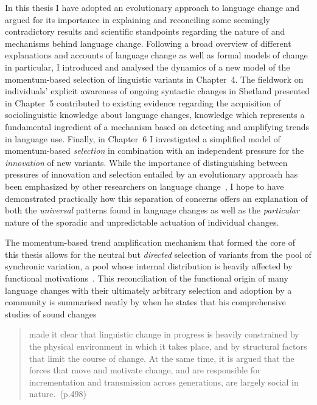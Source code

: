 In this thesis I have adopted an evolutionary approach to language change and argued for its importance in explaining and reconciling some seemingly contradictory results and scientific standpoints regarding the nature of and mechanisms behind language change.
Following a broad overview of different explanations and accounts of language change as well as formal models of change in particular, I introduced and analysed the dynamics of a new model of the momentum-based selection of linguistic variants in Chapter~4. The fieldwork on individuals' explicit awareness of ongoing syntactic changes in Shetland presented in Chapter~5 contributed to existing evidence regarding the acquisition of sociolinguistic knowledge about language changes, knowledge which represents a fundamental ingredient of a mechanism based on detecting and amplifying trends in language use.
Finally, in Chapter~6 I investigated a simplified model of momentum-based \emph{selection} in combination with an independent pressure for the \emph{innovation} of new variants.
While the importance of distinguishing between pressures of innovation and selection entailed by an evolutionary approach has been emphasized by other researchers on language change~\citep[particularly][]{Croft2000},
I hope to have demonstrated practically how this separation of concerns offers an explanation of both the \emph{universal} patterns found in language changes as well as the \emph{particular} nature of the sporadic and unpredictable actuation of individual changes.

The momentum-based trend amplification mechanism that formed the core of this thesis allows for the neutral but \emph{directed} selection of variants from the pool of synchronic variation, a pool whose internal distribution is heavily affected by functional motivations~\citep{Ohala1989}. This reconciliation of the functional origin of many language changes with their ultimately arbitrary selection and adoption by a community is summarised neatly by \citet{Labov2001} when he states that his comprehensive studies of sound changes

\begin{quote}
made it clear that linguistic change in progress is heavily constrained by the physical environment in which it takes place, and by structural factors that limit the course of change. At the same time, it is argued that the forces that move and motivate change, and are responsible for incrementation and transmission across generations, are largely social in nature.~(p.498)
\end{quote}

